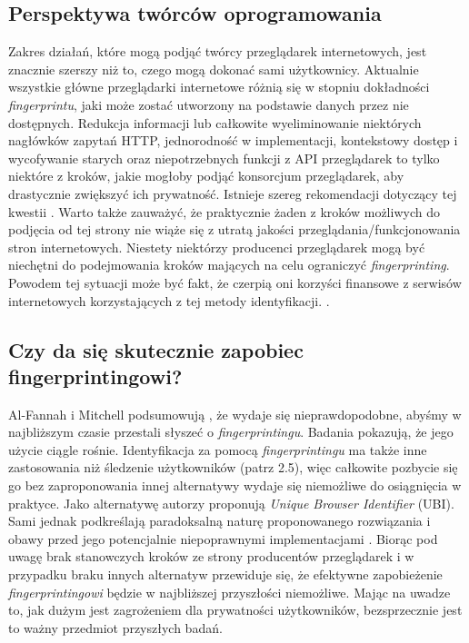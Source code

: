\subsection{Perspektywa twórców oprogramowania}
Zakres działań, które mogą podjąć twórcy przeglądarek internetowych, jest
znacznie szerszy niż to, czego mogą dokonać sami użytkownicy. Aktualnie
wszystkie główne przeglądarki internetowe różnią się w stopniu dokładności
\emph{fingerprintu}, jaki może zostać utworzony na podstawie danych przez nie
dostępnych. Redukcja informacji lub całkowite wyeliminowanie niektórych
nagłówków zapytań HTTP, jednorodność w implementacji, kontekstowy dostęp i
wycofywanie starych oraz niepotrzebnych funkcji z API przeglądarek to tylko
niektóre z kroków, jakie mogłoby podjąć konsorcjum przeglądarek, aby drastycznie
zwiększyć ich prywatność. Istnieje szereg rekomendacji dotyczący tej kwestii
\cite{cooper2013rfc,doty2014fingerprinting,eckersley2010unique,nikiforakis2014workings}.
Warto także zauważyć, że praktycznie żaden z kroków możliwych do podjęcia od tej
strony nie wiąże się z utratą jakości przeglądania/funkcjonowania stron
internetowych. Niestety niektórzy producenci przeglądarek mogą być niechętni do
podejmowania kroków mających na celu ograniczyć \emph{fingerprinting}. Powodem
tej sytuacji może być fakt, że czerpią oni korzyści finansowe z serwisów
internetowych korzystających z tej metody identyfikacji. \cite[s.
13]{al2020too}.

\subsection{Czy da się skutecznie zapobiec fingerprintingowi?}
Al-Fannah i Mitchell podsumowują \cite[s. 18]{al2020too}, że wydaje się
nieprawdopodobne, abyśmy w najbliższym czasie przestali słyszeć o
\emph{fingerprintingu}. Badania pokazują, że jego użycie ciągle rośnie.
Identyfikacja za pomocą \emph{fingerprintingu} ma także inne zastosowania niż
śledzenie użytkowników (patrz 2.5), więc całkowite pozbycie się go bez
zaproponowania innej alternatywy wydaje się niemożliwe do osiągnięcia w
praktyce. Jako alternatywę autorzy proponują \emph{Unique Browser Identifier}
(UBI). Sami jednak podkreślają paradoksalną naturę proponowanego rozwiązania i
obawy przed jego potencjalnie niepoprawnymi implementacjami \cite[s.
16]{al2020too}. Biorąc pod uwagę brak stanowczych kroków ze strony producentów
przeglądarek i w przypadku braku innych alternatyw przewiduje się, że efektywne
zapobieżenie \emph{fingerprintingowi} będzie w najbliższej przyszłości
niemożliwe. Mając na uwadze to, jak dużym jest zagrożeniem dla prywatności
użytkowników, bezsprzecznie jest to ważny przedmiot przyszłych badań.

